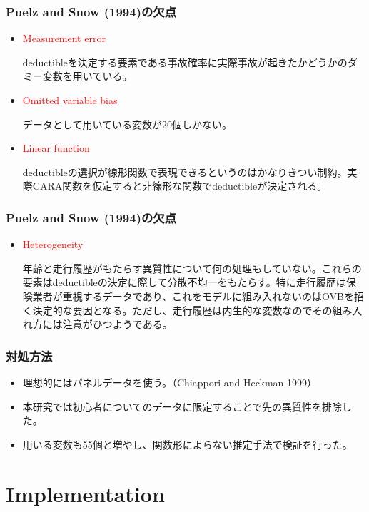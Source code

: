 \documentclass[dvipdfmx, 12pt]{beamer}
\begin{document}
\begin{frame}\frametitle{Puelz and Snow (1994)の欠点}
	\begin{itemize}
	\item \textcolor{red}{Measurement error}
	
	deductibleを決定する要素である事故確率に実際事故が起きたかどうかのダミー変数を用いている。
	\item \textcolor{red}{Omitted variable bias}
	
	データとして用いている変数が20個しかない。
	\item \textcolor{red}{Linear function}
	
	deductibleの選択が線形関数で表現できるというのはかなりきつい制約。実際CARA関数を仮定すると非線形な関数でdeductibleが決定される。
	\end{itemize}
\end{frame}

\begin{frame}\frametitle{Puelz and Snow (1994)の欠点}
	\begin{itemize}
	\item \textcolor{red}{Heterogeneity}
	
	年齢と走行履歴がもたらす異質性について何の処理もしていない。これらの要素はdeductibleの決定に際して分散不均一をもたらす。特に走行履歴は保険業者が重視するデータであり、これをモデルに組み入れないのはOVBを招く決定的な要因となる。ただし、走行履歴は内生的な変数なのでその組み入れ方には注意がひつようである。
	\end{itemize}
\end{frame}

\begin{frame}\frametitle{対処方法}
	\begin{itemize}
	\item 理想的にはパネルデータを使う。（Chiappori and Heckman 1999）
	\item 本研究では初心者についてのデータに限定することで先の異質性を排除した。
	\item 用いる変数も55個と増やし、関数形によらない推定手法で検証を行った。
	\end{itemize}
\end{frame}


\section{Implementation}
\end{document}
